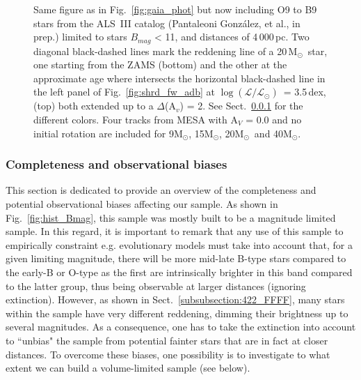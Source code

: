\documentclass{aa}
\newcommand{\MSol}{\mbox{M$_\odot$}}
\newcommand{\logLs}{$\log (\mathcal{L}/\mathcal{L}_{\odot})$}
\begin{document}
\begin{figure}[!t]
\centering
{}
\caption{Same figure as in Fig.~\ref{fig:gaia_phot} but now including O9 to B9 stars from the ALS~III catalog (Pantaleoni González, et al., in prep.) limited to stars $B_{mag}$ < 11, and distances of 4\,000\,pc. Two diagonal black-dashed lines mark the reddening line of a 20\,\MSol\ star, one starting from the ZAMS (bottom) and the other at the approximate age where intersects the horizontal black-dashed line in the left panel of Fig.~\ref{fig:shrd_fw_adb} at \logLs\ = 3.5\,dex, (top) both extended up to a $\Delta$(A$_{v}$) = 2. See Sect.~\ref{subsubsection:423_LLLLL} for the different colors. Four tracks from MESA with A$_{V}$ = 0.0 and no initial rotation are included for 9\MSol, 15\MSol, 20\MSol\ and 40\MSol.} 
\label{fig:gaia_alsIII}
\end{figure}


\subsubsection{Completeness and observational biases}
\label{subsubsection:423_LLLLL}

This section is dedicated to provide an overview of the completeness and potential observational biases affecting our sample. As shown in Fig.~\ref{fig:hist_Bmag}, this sample was mostly built to be a magnitude limited sample. In this regard, it is important to remark that any use of this sample to empirically constraint e.g. evolutionary models must take into account that, for a given limiting magnitude, there will be more mid-late B-type stars compared to the early-B or O-type as the first are intrinsically brighter in this band compared to the latter group, thus being observable at larger distances (ignoring extinction). However, as shown in Sect.~\ref{subsubsection:422_FFFF}, many stars within the sample have very different reddening, dimming their brightness up to several magnitudes. As a consequence, one has to take the extinction into account to ``unbias" the sample from potential fainter stars that are in fact at closer distances. To overcome these biases, one possibility is to investigate to what extent we can build a volume-limited sample (see below).
\end{document}
